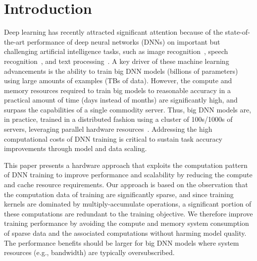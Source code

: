 \section{Introduction}
Deep learning has recently attracted significant attention because of the state-of-the-art performance of deep neural networks (DNNs) on important but challenging artificial intelligence tasks, such as image recognition~\cite{Krizhevsky12, Le12, Dean12, Chilimbi14}, speech recognition~\cite{Dahl12, Hinton12, hannun2014deepspeech}, and text processing~\cite{collobert2008, Collobert11, mikolov2013}.  A key driver of these machine learning advancements is the ability to train big DNN models (billions of parameters) using large amounts of examples (TBs of data).   However, the compute and memory resources required to train big models to reasonable accuracy in a practical amount of time (days instead of months) are significantly high, and surpass the capabilities of a single commodity server.  Thus, big DNN models are, in practice, trained in a distributed fashion using a cluster of 100s/1000s of servers, leveraging parallel hardware resources~\cite{Dean12, Chilimbi14}.  Addressing the high computational costs of DNN training is critical to sustain task accuracy improvements through model and data scaling.

This paper presents a hardware approach that exploits the computation pattern of DNN training to improve performance and scalability by reducing the compute and cache resource requirements.  Our approach is based on the observation that the computation data of training are significantly sparse, and since training kernels are dominated by multiply-accumulate operations, a significant portion of these computations are redundant to the training objective. 
We therefore improve training performance by avoiding the compute and memory system consumption of sparse data and the associated computations without harming model quality. The performance benefits should be larger for big DNN models where system resources (e.g., bandwidth) are typically oversubscribed. 


